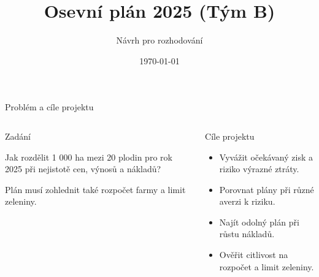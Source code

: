 \documentclass[11pt]{beamer}
\title{Osevní plán 2025 (Tým B)}
\author{Návrh pro rozhodování}
\date{\today}
\begin{document}
\begin{frame}
  \titlepage%
\end{frame}

\begin{frame}{Problém a cíle projektu}
  \begin{columns}[T,onlytextwidth]
    \begin{block}{Zadání}
      \begin{minipage}[t][4.4cm][t]{\linewidth}
        \raggedright%
        \large
        Jak rozdělit 1 000 ha mezi 20 plodin pro rok 2025 při nejistotě cen, výnosů a nákladů?
        \normalsize
        \vspace{0.2cm}

        Plán musí zohlednit také rozpočet farmy a limit zeleniny.
      \end{minipage}
    \end{block}

    \begin{block}{Cíle projektu}
      \begin{minipage}[t][4.4cm][t]{\linewidth}
        \raggedright%
        \begin{itemize}
          \item Vyvážit očekávaný zisk a riziko výrazné ztráty.
          \item Porovnat plány při různé averzi k riziku.
          \item Najít odolný plán při růstu nákladů.
          \item Ověřit citlivost na rozpočet a limit zeleniny.
        \end{itemize}
      \end{minipage}
    \end{block}
  \end{columns}
\end{frame}
\end{document}
